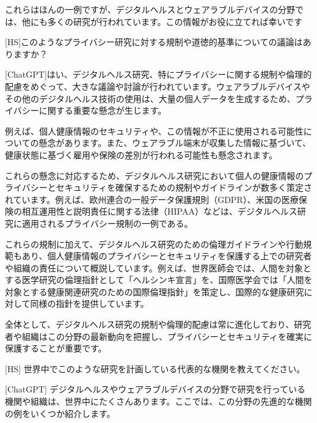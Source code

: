 \documentclass[
]{book}
\theoremstyle{definition}
\theoremstyle{definition}
\theoremstyle{definition}
\theoremstyle{definition}
\theoremstyle{remark}
\begin{document}
これらはほんの一例ですが、デジタルヘルスとウェアラブルデバイスの分野では、他にも多くの研究が行われています。この情報がお役に立てれば幸いです

{[}HS{]}このようなプライバシー研究に対する規制や道徳的基準についての議論はありますか？

{[}ChatGPT{]}はい、デジタルヘルス研究、特にプライバシーに関する規制や倫理的配慮をめぐって、大きな議論や討論が行われています。ウェアラブルデバイスやその他のデジタルヘルス技術の使用は、大量の個人データを生成するため、プライバシーに関する重要な懸念が生じます。

例えば、個人健康情報のセキュリティや、この情報が不正に使用される可能性についての懸念があります。また、ウェアラブル端末が収集した情報に基づいて、健康状態に基づく雇用や保険の差別が行われる可能性も懸念されます。

これらの懸念に対応するため、デジタルヘルス研究において個人の健康情報のプライバシーとセキュリティを確保するための規制やガイドラインが数多く策定されています。例えば、欧州連合の一般データ保護規則（GDPR）、米国の医療保険の相互運用性と説明責任に関する法律（HIPAA）などは、デジタルヘルス研究に適用されるプライバシー規制の一例である。

これらの規制に加えて、デジタルヘルス研究のための倫理ガイドラインや行動規範もあり、個人健康情報のプライバシーとセキュリティを保護する上での研究者や組織の責任について概説しています。例えば、世界医師会では、人間を対象とする医学研究の倫理指針として「ヘルシンキ宣言」を、国際医学会では「人間を対象とする健康関連研究のための国際倫理指針」を策定し、国際的な健康研究に対して同様の指針を提供しています。

全体として、デジタルヘルス研究の規制や倫理的配慮は常に進化しており、研究者や組織はこの分野の最新動向を把握し、プライバシーとセキュリティを確実に保護することが重要です。

{[}HS{]} 世界中でこのような研究を計画している代表的な機関を教えてください。

{[}ChatGPT{]} デジタルヘルスやウェアラブルデバイスの分野で研究を行っている機関や組織は、世界中にたくさんあります。ここでは、この分野の先進的な機関の例をいくつか紹介します。
\end{document}

